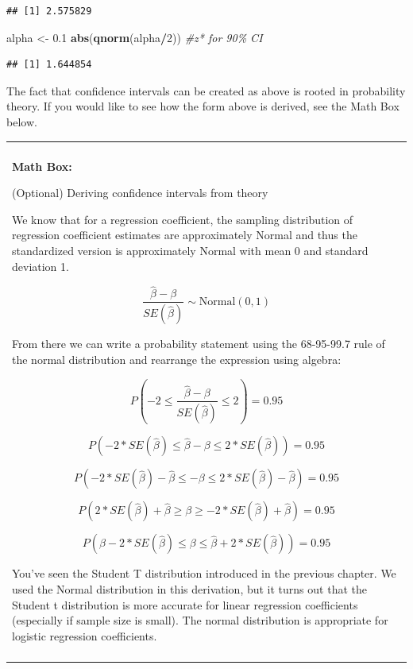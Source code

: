 \documentclass[
]{book}
\newenvironment{Shaded}{\begin{snugshade}}{\end{snugshade}}
\newcommand{\CommentTok}[1]{\textcolor[rgb]{0.56,0.35,0.01}{\textit{#1}}}
\newcommand{\DecValTok}[1]{\textcolor[rgb]{0.00,0.00,0.81}{#1}}
\newcommand{\FloatTok}[1]{\textcolor[rgb]{0.00,0.00,0.81}{#1}}
\newcommand{\FunctionTok}[1]{\textcolor[rgb]{0.13,0.29,0.53}{\textbf{#1}}}
\newcommand{\NormalTok}[1]{#1}
\newcommand{\OtherTok}[1]{\textcolor[rgb]{0.56,0.35,0.01}{#1}}
\newcommand{\SpecialCharTok}[1]{\textcolor[rgb]{0.81,0.36,0.00}{\textbf{#1}}}
\newenvironment{mathbox}
{
    \begin{center}
    
    \begin{tabular}{|p{0.8\textwidth}|}
    \rowcolor{LightYellow}
    \hline\\
    \rowcolor{LightYellow}
    \textbf{Math Box:}
}
{
    \\\rowcolor{LightYellow}
    \\\hline
    \end{tabular} 
    \end{center}
}
\begin{document}
\begin{verbatim}
## [1] 2.575829
\end{verbatim}

\begin{Shaded}
\begin{Highlighting}[]
\NormalTok{alpha }\OtherTok{\textless{}{-}} \FloatTok{0.1} 
\FunctionTok{abs}\NormalTok{(}\FunctionTok{qnorm}\NormalTok{(alpha}\SpecialCharTok{/}\DecValTok{2}\NormalTok{)) }\CommentTok{\#z* for 90\% CI}
\end{Highlighting}
\end{Shaded}

\begin{verbatim}
## [1] 1.644854
\end{verbatim}

The fact that confidence intervals can be created as above is rooted in probability theory. If you would like to see how the form above is derived, see the Math Box below.

\begin{mathbox}
(Optional) Deriving confidence intervals from theory

We know that for a regression coefficient, the sampling distribution of
regression coefficient estimates are approximately Normal and thus the
standardized version is approximately Normal with mean 0 and standard
deviation 1.

\[\frac{\hat{\beta} - \beta}{SE(\hat{\beta})} \sim \text{Normal}(0,1)\]

From there we can write a probability statement using the 68-95-99.7
rule of the normal distribution and rearrange the expression using
algebra:

\[P(-2\leq\frac{\hat{\beta} - \beta}{SE(\hat{\beta})}\leq2) = 0.95\]

\[P(-2 *SE(\hat{\beta})\leq\hat{\beta} - \beta \leq2 *SE(\hat{\beta}) ) = 0.95\]

\[P(-2* SE(\hat{\beta})-\hat{\beta} \leq  -\beta \leq2 *SE(\hat{\beta})-\hat{\beta} ) = 0.95\]

\[P(2 *SE(\hat{\beta})+\hat{\beta} \geq \beta \geq -2* SE(\hat{\beta})+\hat{\beta} ) = 0.95\]

\[P(\hat{\beta}-2 *SE(\hat{\beta}) \leq \beta \leq\hat{\beta}+2 *SE(\hat{\beta}) ) = 0.95\]

You've seen the Student T distribution introduced in the previous
chapter. We used the Normal distribution in this derivation, but it
turns out that the Student t distribution is more accurate for linear
regression coefficients (especially if sample size is small). The normal
distribution is appropriate for logistic regression coefficients.
\end{mathbox}
\end{document}
